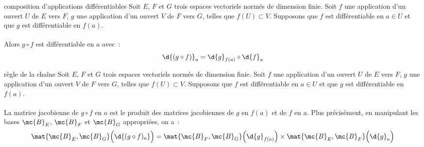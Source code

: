 \begin{theoreme}{19.18}{composition d'applications différentiables}
    Soit $E$, $F$ et $G$ trois espaces vectoriels normés de dimension finie. Soit $f$ une application d'un ouvert $U$ de $E$ vers $F$, $g$ une application d'un ouvert $V$ de $F$ vers $G$, telles que $f(U) \subset V$. Supposons que $f$ est différentiable en $a \in U$ et que $g$ est différentiable en $f(a)$.\\\\
    Alors $g\circ f$ est différentiable en $a$ avec~:
    $$\d{(g\circ f)}_a = \d{g}_{f(a)} \circ \d{f}_a$$
\end{theoreme}

\begin{theoreme}{19.19}{règle de la chaîne}
    Soit $E$, $F$ et $G$ trois espaces vectoriels normés de dimension finie. Soit $f$ une application d'un ouvert $U$ de $E$ vers $F$, $g$ une application d'un ouvert $V$ de $F$ vers $G$, telles que $f(U) \subset V$. Supposons que $f$ est différentiable en $a \in U$ et que $g$ est différentiable en $f(a)$.\\\\
    La matrice jacobienne de $g \circ f$ en $a$ est le produit des matrices jacobiennes de $g$ en $f(a)$ et de $f$ en $a$. Plus précisément, en manipulant les bases $\mc{B}_E$, $\mc{B}_F$ et $\mc{B}_G$ appropriées, on a~:
    $$\mat{\mc{B}_E,\mc{B}_G}\Big(\d{(g \circ f)_a}\Big) = \mat{\mc{B}_F,\mc{B}_G}\Big(\d{g}_{f(a)}\Big) \times \mat{\mc{B}_E,\mc{B}_F}\Big(\d{g}_{a}\Big)$$
\end{theoreme}

